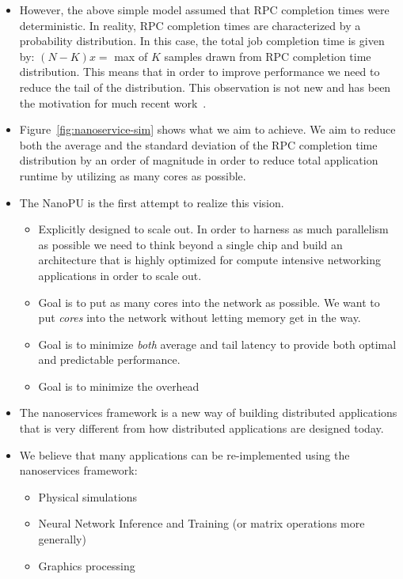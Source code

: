 \begin{itemize}
    \item However, the above simple model assumed that RPC completion times were deterministic. In reality, RPC completion times are characterized by a probability distribution. In this case, the total job completion time is given by: $(N - K)x =$ max of $K$ samples drawn from RPC completion time distribution. This means that in order to improve performance we need to reduce the tail of the distribution. This observation is not new and has been the motivation for much recent work~\cite{shinjuku, shenango, rpcvalet}.
    \item Figure~\ref{fig:nanoservice-sim} shows what we aim to achieve. We aim to reduce both the average and the standard deviation of the RPC completion time distribution by an order of magnitude in order to reduce total application runtime by utilizing as many cores as possible.
    \item The NanoPU is the first attempt to realize this vision.
    \begin{itemize}
        \item Explicitly designed to scale out. In order to harness as much parallelism as possible we need to think beyond a single chip and build an architecture that is highly optimized for compute intensive networking applications in order to scale out.
        \item Goal is to put as many cores into the network as possible. We want to put \emph{cores} into the network without letting memory get in the way. 
        \item Goal is to minimize \emph{both} average and tail latency to provide both optimal and predictable performance.
        \item Goal is to minimize the overhead 
    \end{itemize}
    \item The nanoservices framework is a new way of building distributed applications that is very different from how distributed applications are designed today.
    \item We believe that many applications can be re-implemented using the nanoservices framework:
    \begin{itemize}
        \item Physical simulations
        \item Neural Network Inference and Training (or matrix operations more generally)
        \item Graphics processing

\end{itemize}
\end{itemize}
